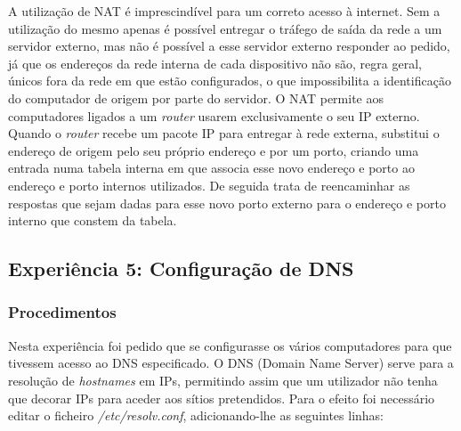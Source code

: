 \documentclass{article}
\begin{document}
A utilização de NAT é imprescindível para um correto acesso à internet. Sem a utilização do mesmo apenas é possível entregar o tráfego de saída da rede a um servidor externo, mas não é possível a esse servidor externo responder ao pedido, já que os endereços da rede interna de cada dispositivo não são, regra geral, únicos fora da rede em que estão configurados, o que impossibilita a identificação do computador de origem por parte do servidor. O NAT permite aos computadores ligados a um \textit{router} usarem exclusivamente o seu IP externo. Quando o \textit{router} recebe um pacote IP para entregar à rede externa, substitui o endereço de origem pelo seu próprio endereço e por um porto, criando uma entrada numa tabela interna em que associa esse novo endereço e porto ao endereço e porto internos utilizados. De seguida trata de reencaminhar as respostas que sejam dadas para esse novo porto externo para o endereço e porto interno que constem da tabela.  

\newpage

\subsection{Experiência 5: Configuração de DNS}
\subsubsection{Procedimentos}
Nesta experiência foi pedido que se configurasse os vários computadores para que tivessem acesso ao DNS especificado. O DNS (Domain Name Server) serve para a resolução de \textit{hostnames} em IPs, permitindo assim que um utilizador não tenha que decorar IPs para aceder aos sítios pretendidos. Para o efeito foi necessário editar o ficheiro \textit{/etc/resolv.conf}, adicionando-lhe as seguintes linhas:
\end{document}
